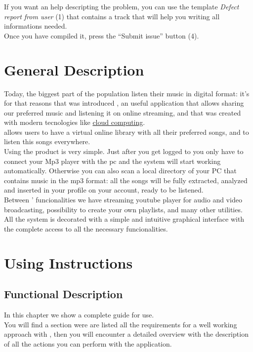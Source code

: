 If you want an help descripting the problem, you can use the template
\emph{Defect report from user} (1) that contains a track that will help you writing all 
informations needed.\\

Once you have compiled it, press the ``Submit issue'' button (4).

\chapter{General Description}
\thispagestyle{fancy}
Today, the biggest part of the population listen their music in digital
format: it's for that reasons that was introduced , an useful
application that allows sharing our preferred music and listening it on online
streaming, and that was created with modern tecnologies like \underline{cloud
computing}.\\

 allows users to have a virtual online library with all their
preferred songs, and to listen this songs everywhere.\\

Using the product is very simple. Just after you get logged to  you
only have to connect your Mp3 player with the pc and the system will start
working automatically. Otherwise you can also scan a local directory of your PC
that contains music in the mp3 format: all the songs will be fully extracted,
analyzed and inserted in your profile on your  account, ready to be
listened.\\

Between ' funcionalities we have streaming youtube player for audio
and video broadcasting, possibility to create your own playlists, and many other
utilities.\\

All the system is decorated with a simple and intuitive graphical interface
with the complete access to all the necessary funcionalities.\\

\chapter{Using Instructions}
\thispagestyle{fancy}

\section{Functional Description}
In this chapter we show a complete guide for  use.\\
You will find a section were are listed all the requirements for a well
working approach with , then you will encounter a detailed overview
with the description of all the actions you can perform with the
application.

